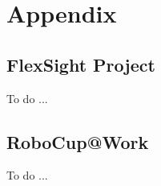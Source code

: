 \chapter{Appendix}\label{apx:appendix}

\section{FlexSight Project}\label{apx:flexsight}
To do ...

\section{RoboCup@Work}\label{apx:robocupatwork}
To do ...